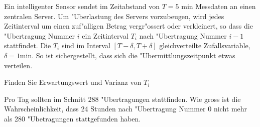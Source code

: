 Ein intelligenter Sensor sendet im Zeitabstand von $T=\text{5 min}$
Messdaten an einen zentralen Server. Um "Uberlastung des Servers
vorzubeugen, wird jedes
Zeitinterval um einen zuf"alligen Betrag vergr"ossert oder verkleinert, so
dass die "Ubertragung Nummer $i$ ein Zeitinterval $T_i$ nach "Ubertragung
Nummer $i-1$ stattfindet.
Die $T_i$ sind im Interval $[T-\delta,T+\delta]$
gleichverteilte Zufallsvariable, $\delta = \text{1min}$.
So ist sichergestellt, dass sich die "Ubermittlungszeitpunkt etwas verteilen.
\begin{teilaufgaben}
\item Finden Sie Erwartungswert und Varianz von $T_i$
\item Pro Tag sollten im Schnitt 288 "Ubertragungen stattfinden. Wie gross
ist die Wahrscheinlichkeit, dass 24 Stunden nach "Ubertragung Nummer $0$
nicht mehr als 280 "Ubetragungen stattgefunden haben.
\end{teilaufgaben}


